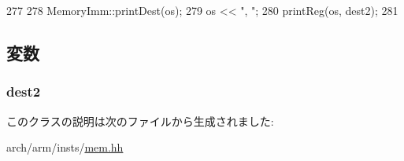 \begin{DoxyCode}
277     {
278         MemoryImm::printDest(os);
279         os << ", ";
280         printReg(os, dest2);
281     }
\end{DoxyCode}


\subsection{変数}
\hypertarget{classArmISA_1_1MemoryDImm_a0425ad33e25c8198da341b8d8c01fcba}{
\subsubsection[{dest2}]{ {\bf dest2}}}
\label{classArmISA_1_1MemoryDImm_a0425ad33e25c8198da341b8d8c01fcba}


このクラスの説明は次のファイルから生成されました:\begin{DoxyCompactItemize}
\item 
arch/arm/insts/\hyperlink{arm_2insts_2mem_8hh}{mem.hh}\end{DoxyCompactItemize}
